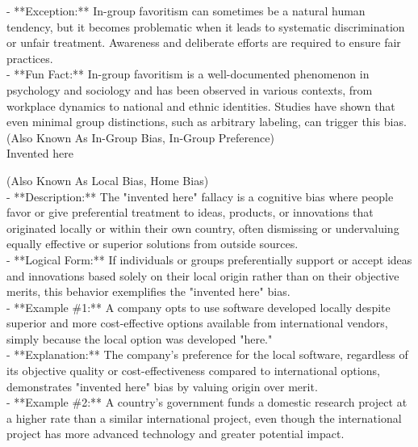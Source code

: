 \documentclass[a4paper,12pt,single,pdftex]{scrartcl}
\begin{document}
    
      - **Exception:** In-group favoritism can sometimes be a natural human tendency, but it becomes problematic when it leads to systematic discrimination or unfair treatment. Awareness and deliberate efforts are required to ensure fair practices.
    \\

    
      - **Fun Fact:** In-group favoritism is a well-documented phenomenon in psychology and sociology and has been observed in various contexts, from workplace dynamics to national and ethnic identities. Studies have shown that even minimal group distinctions, such as arbitrary labeling, can trigger this bias.
    \\

  
    
      (Also Known As In-Group Bias, In-Group Preference)
    \\

  

Invented here
    
      (Also Known As Local Bias, Home Bias)
    \\

  
    
      - **Description:** The "invented here" fallacy is a cognitive bias where people favor or give preferential treatment to ideas, products, or innovations that originated locally or within their own country, often dismissing or undervaluing equally effective or superior solutions from outside sources.
    \\

    
      - **Logical Form:** If individuals or groups preferentially support or accept ideas and innovations based solely on their local origin rather than on their objective merits, this behavior exemplifies the "invented here" bias.
    \\

    
      - **Example \#1:** A company opts to use software developed locally despite superior and more cost-effective options available from international vendors, simply because the local option was developed "here."
    \\

    
      - **Explanation:** The company’s preference for the local software, regardless of its objective quality or cost-effectiveness compared to international options, demonstrates "invented here" bias by valuing origin over merit.
    \\

    
      - **Example \#2:** A country’s government funds a domestic research project at a higher rate than a similar international project, even though the international project has more advanced technology and greater potential impact.
    \\
\end{document}
